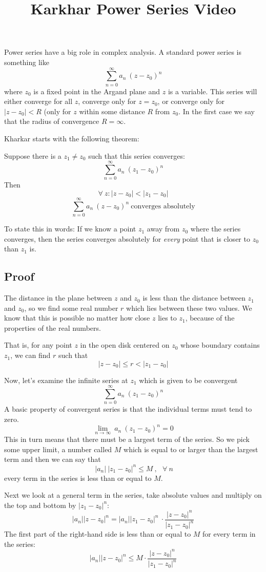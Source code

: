 \documentclass[11pt, oneside]{article}   	%
\title{Karkhar Power Series Video}
\date{}							%
\begin{document}
\maketitle
\Large
Power series have a big role in complex analysis.  A standard power series is something like
\[ \sum_{n=0}^{\infty} a_n \ (z - z_0)^n \]
where $z_0$ is a fixed point in the Argand plane and $z$ is a variable.  This series will either converge for all $z$, converge only for $z = z_0$, or converge only for $| z - z_0 | < R$ (only for $z$ within some distance $R$ from $z_0$.  In the first case we say that the radius of convergence $R = \infty$.

Kharkar starts with the following theorem:

Suppose there is a $z_1 \ne z_0$ such that this series converges:
\[ \sum_{n=0}^{\infty} a_n \ (z_1 - z_0)^n \]
Then
\[ \forall \ z: |z - z_0| < |z_1 - z_0| \]
\[ \sum_{n=0}^{\infty} a_n \ (z - z_0)^n \ \text{converges absolutely} \]

To state this in words:  If we know a point $z_1$ away from $z_0$ where the series converges, then the series converges absolutely for \emph{every} point that is closer to $z_0$ than $z_1$ is.

\subsection*{Proof}
The distance in the plane between $z$ and $z_0$ is less than the distance between $z_1$ and $z_0$, so we find some real number $r$ which lies between these two values.  We know that this is possible no matter how close $z$ lies to $z_1$, because of the properties of the real numbers.

That is, for any point $z$ in the open disk centered on $z_0$ whose boundary contains $z_1$, we can find $r$ such that
\[ |z-z_0| \le r < |z_1-z_0| \]

Now, let's examine the infinite series at $z_1$ which is given to be convergent
\[ \sum_{n=0}^{\infty} a_n \ (z_1 - z_0)^n \]
A basic property of convergent series is that the individual terms must tend to zero.
\[ \lim_{n \rightarrow \infty} \ a_n \ (z_1 - z_0)^n = 0 \]
This in turn means that there must be a largest term of the series.  So we pick some upper limit, a number called $M$ which is equal to or larger than the largest term and then we can say that
\[ \ |a_n| \ |z_1 - z_0|^n \le M \ , \ \ \ \forall \ n \]
every term in the series is less than or equal to $M$.

Next we look at a general term in the series, take absolute values and multiply on the top and bottom by $|z_1 - z_0|^n$:
\[ |a_n| |z - z_0|^n = |a_n| |z_1 - z_0|^n \ \cdot \frac{|z - z_0|^n}{|z_1 - z_0|^n} \]
The first part of the right-hand side is less than or equal to $M$ for every term in the series:
\[ |a_n| |z - z_0|^n \le M \cdot \frac{|z - z_0|^n}{|z_1 - z_0|^n} \]
\end{document}
